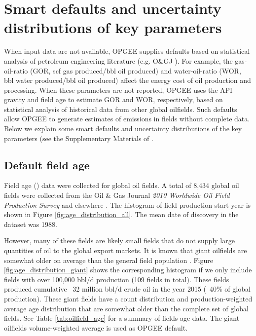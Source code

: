 \documentclass[11pt]{report}
\newcommand{\xlname}[1]{\raisebox{1pt}{\fcolorbox{light-gray}{light-gray}{\texttt{\textcolor{stanford}{\scriptsize{#1}}}}}}
\begin{document}
\clearpage

\section{Smart defaults and uncertainty distributions of key parameters}
\label{sec:smart_defaults}

When input data are not available, OPGEE supplies defaults based on statistical analysis of petroleum engineering literature (e.g. O\&GJ \cite{OGJ2009a}). For example, the gas-oil-ratio (GOR, scf gas produced/bbl oil produced) and water-oil-ratio (WOR, bbl water produced/bbl oil produced) affect the energy cost of oil production and processing. When these parameters are not reported, OPGEE uses the API gravity and field age to estimate GOR and WOR, respectively, based on statistical analysis of historical data from other global oilfields. Such defaults allow OPGEE to generate estimates of emissions in fields without complete data. Below we explain some smart defaults and uncertainty distributions of the key parameters (see the Supplementary Materials of \cite{masnadi2018global}. 

\subsection{Default field age}

Field age (\xlname{Field\_age}) data were collected for global oil fields. A total of 8,434 global oil fields were collected from the Oil \& Gas Journal \emph{2010 Worldwide Oil Field Production Survey} \cite{OGJ2009a} and elsewhere \cite{masnadi2018global}. The histogram of field production start year is shown in Figure \ref{fig:age_distribution_all}. The mean date of discovery in the dataset was 1988.

 However, many of these fields are likely small fields that do not supply large quantities of oil to the global export markets. It is known that giant oilfields are somewhat older on average than the general field population \cite{Simmons2005, Simmons2006, Deffeyes2001, Deffeyes2005}. Figure \ref{fig:age_distribution_giant} shows the corresponding histogram if we only include fields with over 100,000 bbl/d production (109 fields in total). These fields produced cumulative ~32 million bbl/d crude oil in the year 2015 (~40\% of global production). These giant fields have a count distribution and production-weighted average age distribution that are somewhat older than the complete set of global fields. See Table \ref{tab:oilfield_age} for a summary of fields age data. The giant oilfields volume-weighted average is used as OPGEE default. 
 
\end{document}
